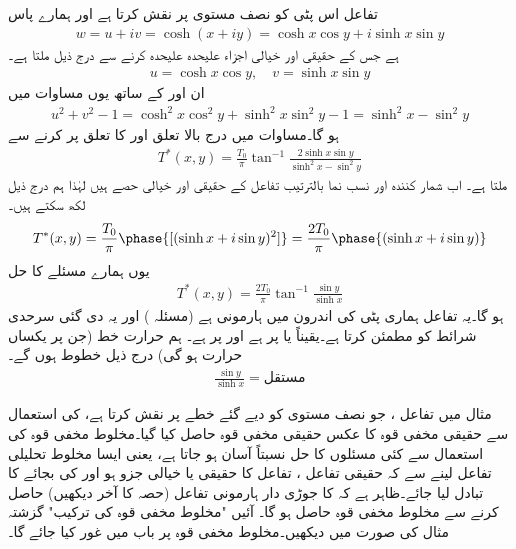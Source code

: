 تفاعل  اس پٹی کو نصف مستوی  پر نقش کرتا ہے اور  ہمارے پاس
\begin{align*}
w=u+iv=\cosh (x+iy)=\cosh x\cos y+i\sinh x\sin y
\end{align*}
ہے جس کے حقیقی اور خیالی اجزاء علیحدہ علیحدہ کرنے سے درج ذیل ملتا ہے۔
\begin{align*}
u=\cosh x\cos y,\quad v=\sinh x\sin y
\end{align*}
ان  اور  کے ساتھ یوں مساوات  میں
\begin{align*}
u^2+v^2-1=\cosh^2 x\cos^2 y+\sinh^2 x\sin^2 y-1=\sinh^2x-\sin^2y
\end{align*}
ہو گا۔مساوات  میں درج بالا تعلق اور  کا تعلق پر کرنے سے
\begin{align*}
T^*(x,y)=\frac{T_0}{\pi}\tan^{-1} \frac{2\sinh x\sin y}{\sinh^2 x-\sin^2 y}
\end{align*}
ملتا ہے۔ اب شمار کنندہ اور نسب نما بالترتیب تفاعل  کے  حقیقی اور خیالی حصے ہیں لہٰذا ہم درج ذیل لکھ سکتے ہیں۔
\begin{align*}
T^*(x,y)=\frac{T_0}{\pi} \phase{[(\sinh x+i\sin y)^2]}=\frac{2T_0}{\pi} \phase{(\sinh x+i\sin y)}
\end{align*}
یوں ہمارے مسئلے کا حل 
\begin{align}
T^*(x,y)=\frac{2T_0}{\pi} \tan^{-1} \frac{\sin y}{\sinh x}
\end{align}
ہو گا۔یہ تفاعل ہماری پٹی کی اندرون میں ہارمونی ہے (مسئلہ ) اور یہ دی گئی سرحدی شرائط کو مطمئن کرتا ہے۔یقیناً  یا  پر  ہے اور  پر  ہے۔ ہم حرارت خط (جن پر یکساں حرارت ہو گی) درج ذیل خطوط ہوں گے۔
\begin{align*}
\frac{\sin y}{\sinh x}=\text{مستقل}
\end{align*}

مثال  میں تفاعل ، جو نصف مستوی کو دیے گئے خطے پر نقش کرتا ہے، کی استعمال سے حقیقی مخفی قوہ   کا عکس حقیقی مخفی قوہ  حاصل کیا گیا۔مخلوط مخفی قوہ کی استعمال سے کئی مسئلوں کا حل نسبتاً آسان ہو جاتا ہے، یعنی ایسا مخلوط تحلیلی تفاعل  لینے سے  کہ حقیقی تفاعل ، تفاعل  کا حقیقی یا خیالی جزو ہو اور  کی بجائے  کا تبادل لیا جائے۔ظاہر ہے کہ  کا جوڑی دار ہارمونی تفاعل (حصہ  کا آخر دیکھیں) حاصل کرنے سے  مخلوط مخفی قوہ   حاصل ہو گا۔  آئیں  "مخلوط مخفی قوہ کی ترکیب"  گزشتہ مثال کی صورت میں دیکھیں۔مخلوط مخفی قوہ پر  باب  میں غور کیا جائے گا۔

